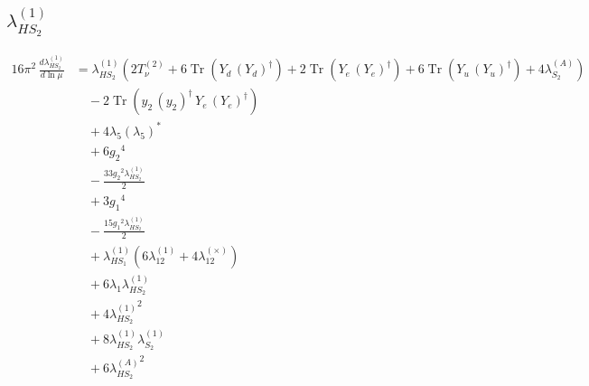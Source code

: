 \documentclass[10pt,a4paper]{article}
\begin{document}
\subsection*{$\lambda_{HS_2}^{(1)}$}
\begin{align*}
16\pi^2\,\frac{d \lambda_{HS_2}^{(1)}}{d\ln\mu} &={\lambda_{HS_2}^{(1)}} (2 T_{\nu}^{(2)}+6 \operatorname{Tr}\!\left({Y_d}\,\left({Y_d}\right)^{\dagger}\right)+2 \operatorname{Tr}\!\left({Y_e}\,\left({Y_e}\right)^{\dagger}\right)+6 \operatorname{Tr}\!\left({Y_u}\,\left({Y_u}\right)^{\dagger}\right)+4 {\lambda_{S_2}^{(A)}}) \\
&\quad -2 \operatorname{Tr}\!\left({y_2}\,\left({y_2}\right)^{\dagger}\,{Y_e}\,\left({Y_e}\right)^{\dagger}\right) \\
&\quad +4 {\lambda_5} \left({\lambda_5}\right)^{*} \\
&\quad +6 {g_2}^4 \\
&\quad -\frac{33 {g_2}^2 {\lambda_{HS_2}^{(1)}}}{2} \\
&\quad +3 {g_1}^4 \\
&\quad -\frac{15 {g_1}^2 {\lambda_{HS_2}^{(1)}}}{2} \\
&\quad +{\lambda_{HS_1}^{(1)}} (6 {\lambda_{12}^{(1)}}+4 {\lambda_{12}^{(\times)}}) \\
&\quad +6 {\lambda_1} {\lambda_{HS_2}^{(1)}} \\
&\quad +4 {\lambda_{HS_2}^{(1)}}^2 \\
&\quad +8 {\lambda_{HS_2}^{(1)}} {\lambda_{S_2}^{(1)}} \\
&\quad +6 {\lambda_{HS_2}^{(A)}}^2 \\
\end{align*}
\end{document}
